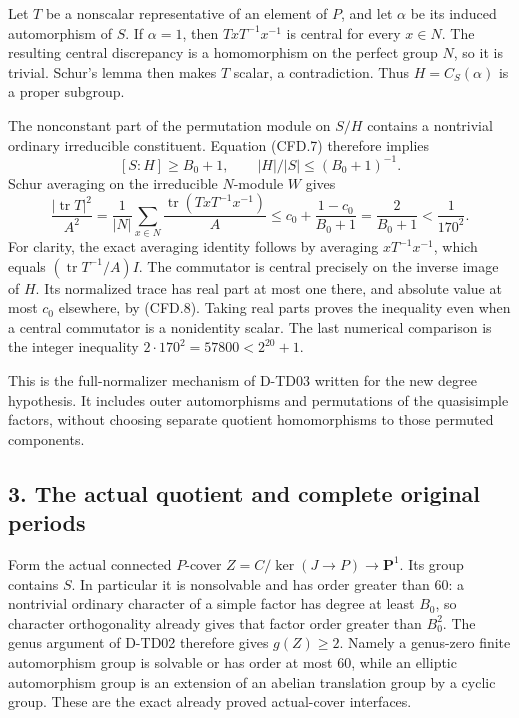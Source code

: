 Let $T$ be a nonscalar representative of an element of $P$, and
let $\alpha$ be its induced automorphism of $S$. If $\alpha=1$,
then $TxT^{-1}x^{-1}$ is central for every $x\in N$. The resulting
central discrepancy is a homomorphism on the perfect group $N$,
so it is trivial. Schur's lemma then makes $T$ scalar, a
contradiction. Thus $H=C_S(\alpha)$ is a proper subgroup.

The nonconstant part of the permutation module on $S/H$ contains
a nontrivial ordinary irreducible constituent. Equation (CFD.7)
therefore implies
\[
                  [S:H]\ge B_0+1,
                  \qquad |H|/|S|\le(B_0+1)^{-1}.
 \tag{CFD.9}
\]
Schur averaging on the irreducible $N$-module $W$ gives
\[
 \frac{|\operatorname{tr}T|^2}{A^2}
  =\frac1{|N|}\sum_{x\in N}
       \frac{\operatorname{tr}(TxT^{-1}x^{-1})}{A}
  \le c_0+\frac{1-c_0}{B_0+1}
  =\frac2{B_0+1}<\frac1{170^2}.
 \tag{CFD.10}
\]
For clarity, the exact averaging identity follows by averaging
$xT^{-1}x^{-1}$, which equals $(\operatorname{tr}T^{-1}/A)I$.
The commutator is central precisely on the inverse image of $H$.
Its normalized trace has real part at most one there, and absolute
value at most $c_0$ elsewhere, by (CFD.8). Taking real parts proves
the inequality even when a central commutator is a nonidentity
scalar. The last numerical comparison is the integer inequality
$2\cdot170^2=57800<2^{20}+1$.

This is the full-normalizer mechanism of D-TD03 written for the
new degree hypothesis. It includes outer automorphisms and
permutations of the quasisimple factors, without choosing separate
quotient homomorphisms to those permuted components.

\subsection*{3. The actual quotient and complete original periods}

Form the actual connected $P$-cover
$Z=C/\ker(J\to P)\to\mathbf P^1$. Its group contains $S$.
In particular it is nonsolvable and has order greater than 60:
a nontrivial ordinary character of a simple factor has degree at
least $B_0$, so character orthogonality already gives that factor
order greater than $B_0^2$. The genus argument of D-TD02 therefore
gives $g(Z)\ge2$. Namely a genus-zero finite automorphism group is
solvable or has order at most 60, while an elliptic automorphism
group is an extension of an abelian translation group by a cyclic
group. These are the exact already proved actual-cover interfaces.

